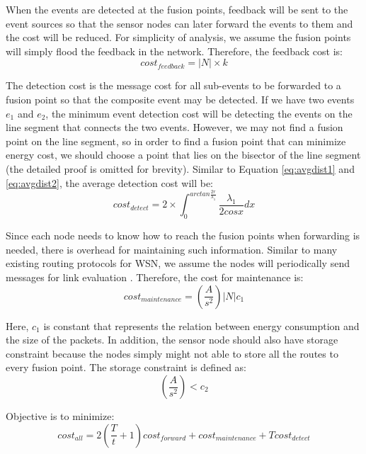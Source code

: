 When the events are detected at the fusion points, feedback will be sent to the event sources so that the sensor nodes can later forward the events to them and the cost will be reduced. For simplicity of analysis, we assume the fusion points will simply flood the feedback in the network. Therefore, the feedback cost is:
\begin{displaymath}
cost_{feedback}=|N|\times k
\end{displaymath}

The detection cost is the message cost for all sub-events to be forwarded to a fusion point so that the composite event may be detected. If we have two events \(e_1\) and \(e_2\), the minimum event detection cost will be detecting the events on the line segment that connects the two events. However, we may not find a fusion point on the line segment, so in order to find a fusion point that can minimize energy cost, we should choose a point that lies on the bisector of the line segment (the detailed proof is omitted for brevity). Similar to Equation \ref{eq:avgdist1} and \ref{eq:avgdist2}, the average detection cost will be:
\begin{displaymath}
cost_{detect}=2\times \int_0^{arctan\frac{2r}{{\lambda}_1}}\frac{{\lambda}_1}{2cosx}dx
\end{displaymath}

Since each node needs to know how to reach the fusion points when forwarding is needed, there is overhead for maintaining such information. Similar to many existing routing protocols for WSN, we assume the nodes will periodically send messages for link evaluation \cite{rssiroute}. Therefore, the cost for maintenance is:
\begin{displaymath}
cost_{maintenance}=(\frac{A}{s^2})|N|c_1
\end{displaymath}

Here, \(c_1\) is constant that represents the relation between energy consumption and the size of the packets. In addition, the sensor node should also have storage constraint because the nodes simply might not able to store all the routes to every fusion point. The storage constraint is defined as:
\begin{displaymath}
(\frac{A}{s^2})<c_2
\end{displaymath}

Objective is to minimize:
\begin{displaymath}
cost_{all}=2(\frac{T}{t}+1)cost_{forward}+cost_{maintenance}+Tcost_{detect}
\end{displaymath}

